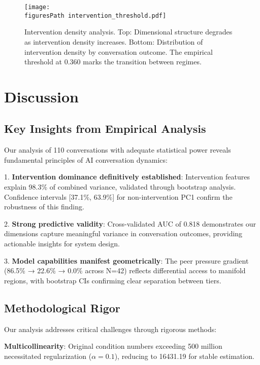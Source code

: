 \documentclass[11pt,letterpaper]{article}
\newcommand{\totalConversations}{110}
\newcommand{\nonReasoningCount}{42}
\newcommand{\regularizedConditionNumber}{16431.19}
\newcommand{\regularizationAlpha}{0.1}
\newcommand{\allFeaturesPCOne}{98.3\%}  %
\newcommand{\nonInterventionPCOneCILower}{37.1\%}
\newcommand{\nonInterventionPCOneCIUpper}{63.9\%}
\newcommand{\testAUC}{0.818}
\newcommand{\interventionThreshold}{0.360}
\newcommand{\fullReasoningPeerPressure}{86.5\%}
\newcommand{\lightReasoningPeerPressure}{22.6\%}
\newcommand{\nonReasoningPeerPressure}{0.0\%}
\newcommand{\figuresPath}{../analysis/analysis_outputs_n110/figures/}
\begin{document}
\begin{figure}[htbp]
\centering
\texttt{[image: \\figuresPath intervention\_threshold.pdf]}
\caption{Intervention density analysis. Top: Dimensional structure degrades as intervention density increases. Bottom: Distribution of intervention density by conversation outcome. The empirical threshold at \interventionThreshold{} marks the transition between regimes.}
\label{fig:intervention_threshold}
\end{figure}

\section{Discussion}

\subsection{Key Insights from Empirical Analysis}

Our analysis of \totalConversations{} conversations with adequate statistical power reveals fundamental principles of AI conversation dynamics:

1. \textbf{Intervention dominance definitively established}: Intervention features explain \allFeaturesPCOne{} of combined variance, validated through bootstrap analysis. Confidence intervals [\nonInterventionPCOneCILower{}, \nonInterventionPCOneCIUpper{}] for non-intervention PC1 confirm the robustness of this finding.

2. \textbf{Strong predictive validity}: Cross-validated AUC of \testAUC{} demonstrates our dimensions capture meaningful variance in conversation outcomes, providing actionable insights for system design.

3. \textbf{Model capabilities manifest geometrically}: The peer pressure gradient (\fullReasoningPeerPressure{} → \lightReasoningPeerPressure{} → \nonReasoningPeerPressure{} across N=\nonReasoningCount{}) reflects differential access to manifold regions, with bootstrap CIs confirming clear separation between tiers.

\subsection{Methodological Rigor}

Our analysis addresses critical challenges through rigorous methods:

\textbf{Multicollinearity}: Original condition numbers exceeding 500 million necessitated regularization ($\alpha = \regularizationAlpha{}$), reducing to \regularizedConditionNumber{} for stable estimation.
\end{document}
